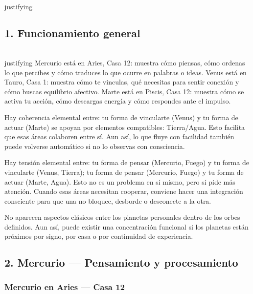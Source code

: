 \documentclass[11pt,a4paper]{article}
\begin{document}
\\justifying

\vspace{0.8cm}

\subsection{1. Funcionamiento general}

\\justifying
Mercurio está en Aries, Casa 12: muestra cómo piensas, cómo ordenas lo que percibes y cómo traduces lo que ocurre en palabras o ideas.
Venus está en Tauro, Casa 1: muestra cómo te vinculas, qué necesitas para sentir conexión y cómo buscas equilibrio afectivo.
Marte está en Piscis, Casa 12: muestra cómo se activa tu acción, cómo descargas energía y cómo respondes ante el impulso.

Hay coherencia elemental entre: tu forma de vincularte (Venus) y tu forma de actuar (Marte) se apoyan por elementos compatibles: Tierra/Agua. Esto facilita que esas áreas colaboren entre sí. Aun así, lo que fluye con facilidad también puede volverse automático si no lo observas con consciencia.

Hay tensión elemental entre: tu forma de pensar (Mercurio, Fuego) y tu forma de vincularte (Venus, Tierra); tu forma de pensar (Mercurio, Fuego) y tu forma de actuar (Marte, Agua). Esto no es un problema en sí mismo, pero sí pide más atención. Cuando esas áreas necesitan cooperar, conviene hacer una integración consciente para que una no bloquee, desborde o desconecte a la otra.

No aparecen aspectos clásicos entre los planetas personales dentro de los orbes definidos. Aun así, puede existir una concentración funcional si los planetas están próximos por signo, por casa o por continuidad de experiencia.

\vspace{0.8cm}

\subsection{2. Mercurio — Pensamiento y procesamiento}

\subsubsection*{Mercurio en Aries — Casa 12}
\end{document}
